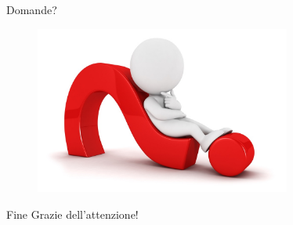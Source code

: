 \documentclass[11pt,aspectratio=169]{beamer}
\begin{document}
\begin{frame}{Domande?}
    \begin{figure}
\centering
    \includegraphics[width=0.75\textwidth]{../img/questions.jpg}
\end{figure}
\end{frame}

\begin{frame}{Fine}
    \centering
    \huge Grazie dell'attenzione!
\end{frame}
\end{document}
